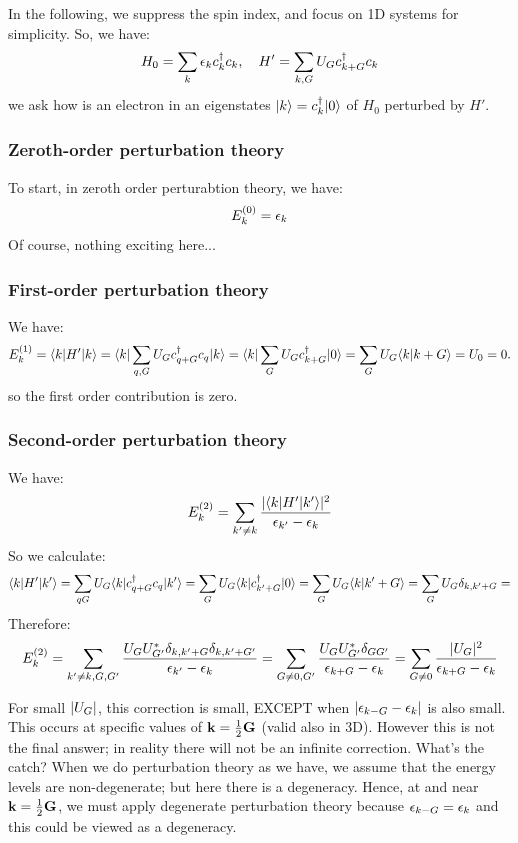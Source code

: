 In the following, we suppress the spin index, and focus on 1D systems for simplicity. So, we have:
\begin{align*}
    H_0 = \sum_k \epsilon_k c^\dagger_k c_k, \quad H' = \sum_{k, G} U_G c^\dagger_{k + G}c_k
\end{align*}
we ask how is an electron in an eigenstates $\lvert k \rangle = c^\dagger_k \lvert 0 \rangle$ of $H_0$ perturbed by $H'$.

\subsubsection{Zeroth-order perturbation theory}
To start, in zeroth order perturabtion theory, we have:
\begin{equation}
    E_k^{(0)} = \epsilon_k
\end{equation}
Of course, nothing exciting here...

\subsubsection{First-order perturbation theory}
We have:
\begin{equation}
    E_k^{(1)} = \langle k \rvert H'\lvert k \rangle = \langle k \rvert\sum_{q,G} U_G c^\dagger_{q + G}c_q\lvert k \rangle = \langle k \rvert\sum_G U_G c_{k+G}^\dagger \lvert 0 \rangle = \sum_G U_G\langle k \lvert k+G \rangle = U_0 = 0.
\end{equation}
so the first order contribution is zero.

\subsubsection{Second-order perturbation theory}
We have:
\begin{equation}
    E_k^{(2)} = \sum_{k' \neq k} \frac{\lvert \langle k \rvert H'\lvert k' \rangle \rvert^2}{\epsilon_{k'} - \epsilon_k}
\end{equation}
So we calculate:
\begin{equation}
    \langle k \rvert H'\lvert k' \rangle = \sum_{qG}U_G\langle k \rvert c^\dagger_{q + G}c_q \lvert k' \rangle = \sum_G U_G\langle k \rvert c^\dagger_{k'+G}\lvert 0 \rangle = \sum_G U_G\langle k \lvert k'+G \rangle = \sum_G U_G \delta_{k, k'+G} = 
\end{equation}
Therefore:
\begin{equation}
    E_k^{(2)} = \sum_{k' \neq k, G, G'}\frac{U_G U_{G'}^* \delta_{k,k'+G}\delta_{k, k'+G'}}{\epsilon_{k'} - \epsilon_k} = \sum_{G \neq 0,G'} \frac{U_G U_{G'}^* \delta_{GG'}}{\epsilon_{k+G} - \epsilon_k} = \sum_{G \neq 0} \frac{\lvert U_G \rvert^2}{\epsilon_{k+G} - \epsilon_k}
\end{equation}

For small $\lvert U_G \rvert$, this correction is small, EXCEPT when $\lvert \epsilon_{k - G} - \epsilon_k \rvert$ is also small. This occurs at specific values of $\mathbf{k} = \frac{1}{2}\mathbf{G}$ (valid also in 3D). However this is not the final answer; in reality there will not be an infinite correction. What's the catch? When we do perturbation theory as we have, we assume that the energy levels are non-degenerate; but here there is a degeneracy. Hence, at and near $\mathbf{k} = \frac{1}{2}\mathbf{G}$, we must apply degenerate perturbation theory because $\epsilon_{k - G} = \epsilon_k$ and this could be viewed as a degeneracy.

